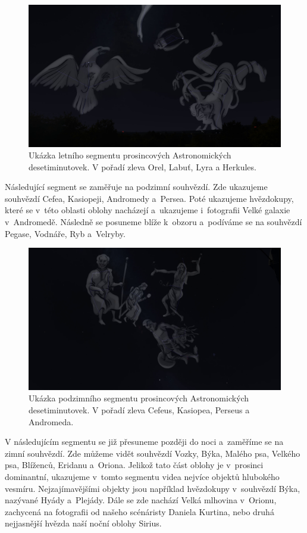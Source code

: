 \documentclass[12pt,a4paper,titlepage]{article}
\begin{document}
\begin{figure}[H]
	\centering
	\includegraphics[width=.95\textwidth]{ac12_leto.png}
	\caption{Ukázka letního segmentu prosincových Astronomických desetiminutovek. V pořadí zleva Orel, Labuť, Lyra a Herkules.}\label{prac:ac12_leto}
\end{figure}

Následující segment se zaměřuje na podzimní souhvězdí. Zde ukazujeme souhvězdí Cefea, Kasiopeji, Andromedy a~Persea. Poté ukazujeme hvězdokupy, které se v~této oblasti oblohy nacházejí a~ukazujeme i~fotografii Velké galaxie v~Andromedě. Následně se posuneme blíže k~obzoru a~podíváme se na souhvězdí Pegase, Vodnáře, Ryb a~Velryby. 

\begin{figure}[H]
	\centering
	\includegraphics[width=.95\textwidth]{ac12_podzim.png}
	\caption{Ukázka podzimního segmentu prosincových Astronomických desetiminutovek. V pořadí zleva Cefeus, Kasiopea, Perseus a Andromeda.}\label{prac:ac12_podzim}
\end{figure}

V následujícím segmentu se již přesuneme později do noci a~zaměříme se na zimní souhvězdí. Zde můžeme vidět souhvězdí Vozky, Býka, Malého psa, Velkého psa, Blíženců, Eridanu a~Oriona. Jelikož tato část oblohy je v~prosinci dominantní, ukazujeme v~tomto segmentu videa nejvíce objektů hlubokého vesmíru. Nejzajímavějšími objekty jsou například hvězdokupy v~souhvězdí Býka, nazývané Hyády a~Plejády. Dále se zde nachází Velká mlhovina v~Orionu, zachycená na fotografii od našeho scénáristy Daniela Kurtina, nebo druhá nejjasnější hvězda naší noční oblohy Sirius.
\end{document}
